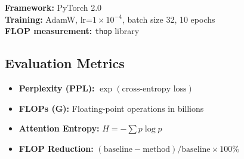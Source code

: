 \textbf{Framework:} PyTorch 2.0 \\
\textbf{Training:} AdamW, lr=$1 \times 10^{-4}$, batch size 32, 10 epochs \\
\textbf{FLOP measurement:} \texttt{thop} library

\subsection{Evaluation Metrics}

\begin{itemize}
    \item \textbf{Perplexity (PPL):} $\exp(\text{cross-entropy loss})$
    \item \textbf{FLOPs (G):} Floating-point operations in billions
    \item \textbf{Attention Entropy:} $H = -\sum p \log p$
    \item \textbf{FLOP Reduction:} $(\text{baseline} - \text{method}) / \text{baseline} \times 100\%$
\end{itemize}
